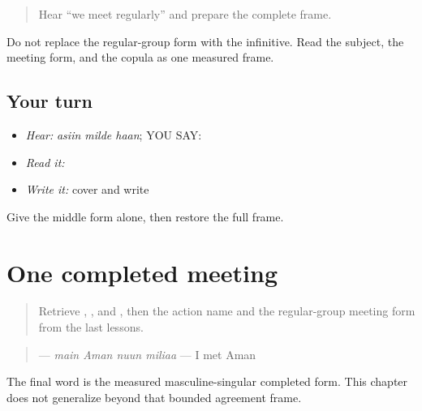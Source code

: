 \label{lesson:PA-C188-milde-review}



\begin{quote}
Hear “we meet regularly” and prepare the complete frame.
\end{quote}

\begin{grammarlens}[title={Grammar Lens}]
Do not replace the regular-group form with the infinitive. Read the subject, the meeting form, and the copula as one measured frame.
\end{grammarlens}

\subsection*{Your turn}
\begin{itemize}
\raggedright
  \item \emph{Hear:} \emph{asiin milde haan}; YOU SAY: \textbf{  }
  \item \emph{Read it:} \textbf{  }
  \item \emph{Write it:} cover and write \textbf{  }
\end{itemize}

\begin{tcolorbox}[breakable,colback=teal!4,colframe=teal!35!black,title={Before you move on}]
Give the middle form alone, then restore the full frame.
\end{tcolorbox}
\section[\texorpdfstring{\pa{ਮੈਂ} \pa{ਅਮਨ} \pa{ਨੂੰ} \pa{ਮਿਲਿਆ} (main Aman nuun miliaa)}{ਮੈਂ ਅਮਨ ਨੂੰ ਮਿਲਿਆ (main Aman nuun miliaa)}]{One completed meeting}

\label{lesson:PA-C188-milia}



\begin{quote}
Retrieve \textbf{}, \textbf{}, and \textbf{}, then the action name and the regular-group meeting form from the last lessons.
\end{quote}

\begin{grammarlens}[title={Grammar Lens: masculine singular completed form}]
\begin{quote}
\textbf{   } — \emph{main Aman nuun miliaa} — I met Aman
\end{quote}

The final word is the measured masculine-singular completed form. This chapter does not generalize beyond that bounded agreement frame.
\end{grammarlens}

